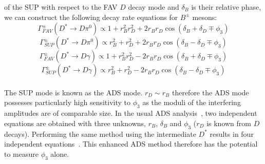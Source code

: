 \documentclass[oneside,12pt]{article}
\begin{document}
of the SUP with respect to the FAV $D$ decay mode and $\delta_{B}$ is their
relative phase, we can construct the following decay rate equations for
$B^{\pm}$ mesons:
  \begin{equation}
		\Gamma_{FAV}^{\pm}(D^{*}\rightarrow D\pi^{0})\propto 1 + r_{B}^{2}r_{D}^{2} + 2r_{B}r_{D}\cos(\delta_{B} + \delta_{D} \mp \phi_{3})
    \label{eq:DecayRateADSFAVpi0}
  \end{equation}
  \begin{equation}
		\Gamma_{SUP}^{\pm}(D^{*}\rightarrow D\pi^{0})\propto r_{B}^{2} + r_{D}^{2} + 2r_{B}r_{D}\cos(\delta_{B} - \delta_{D} \mp \phi_{3})
    \label{eq:DecayRateADSSUPpi0}
  \end{equation}
  \begin{equation}
		\Gamma_{FAV}^{\pm}(D^{*}\rightarrow D\gamma)\propto 1 + r_{B}^{2}r_{D}^{2} - 2r_{B}r_{D}\cos(\delta_{B} + \delta_{D} \mp \phi_{3})
    \label{eq:DecayRateADSFAVgamma}
  \end{equation}
  \begin{equation}
		\Gamma_{SUP}^{\pm}(D^{*}\rightarrow D\gamma)\propto r_{B}^{2} + r_{D}^{2} - 2r_{B}r_{D}\cos(\delta_{B} - \delta_{D} \mp \phi_{3})
    \label{eq:DecayRateADSSUPgamma}
  \end{equation}
\\
\noindent The SUP mode is known as the ADS mode. $r_{D} \sim r_{B}$ therefore
the ADS mode possesses particularly high sensitivity to $\phi_3$ as the moduli
of the interfering amplitudes are of comparable size. In the usual ADS
analysis~\cite{ADSRef}, two independent equations are obtained with three
unknowns, $r_B$, $\delta_B$ and $\phi_3$ ($r_{D}$ is known from $D$ decays).
Performing the same method using the intermediate $D^*$ results in four
independent equations~\cite{ADSDstar}. This enhanced ADS method therefore has
the potential to measure $\phi_3$ alone.
\end{document}
